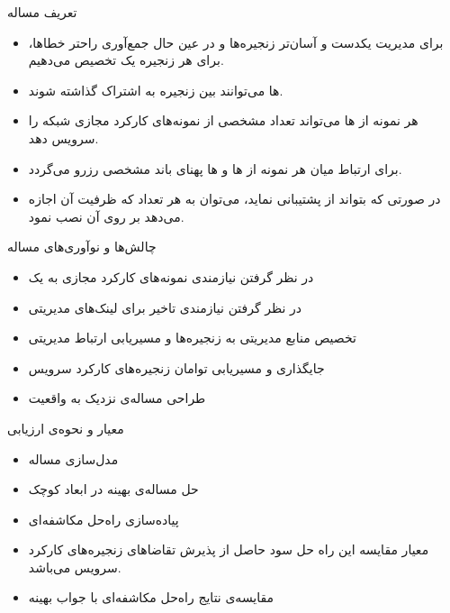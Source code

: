 \documentclass{beamer}
\makeatletter
\newcommand{\RTList}{\raggedleft\rightskip\@totalleftmargin}
\makeatother
\begin{document}
\begin{persian}
\begin{frame}{تعریف مساله}
    \justifying
    \begin{itemize}\RTList{}
        \item برای مدیریت یکدست و آسان‌تر زنجیره‌ها و در عین حال جمع‌آوری راحتر خطاها، برای هر زنجیره یک  تخصیص می‌دهیم.
        \item {}ها می‌توانند بین زنجیره به اشتراک گذاشته شوند.
        \item هر نمونه از ها می‌تواند تعداد مشخصی از نمونه‌های کارکرد مجازی شبکه را سرویس دهد. 
        \item برای ارتباط میان هر نمونه از ها و ها پهنای باند مشخصی رزرو می‌گردد.
        \item در صورتی که  بتواند از  پشتیبانی نماید،
        می‌توان به هر تعداد که ظرفیت آن اجازه می‌دهد بر روی آن  نصب نمود.
    \end{itemize}
\end{frame}
\begin{frame}{چالش‌ها و نوآوری‌های مساله}
    \begin{itemize}\RTList{}
        \item در نظر گرفتن نیازمندی نمونه‌های کارکرد مجازی به یک 
        \item در نظر گرفتن نیازمندی تاخیر برای لینک‌های مدیریتی
        \item تخصیص منابع مدیریتی به زنجیره‌ها و مسیریابی ارتباط مدیریتی
        \item جایگذاری و مسیریابی توامان زنجیره‌های کارکرد سرویس
        \item طراحی مساله‌ی نزدیک به واقعیت
    \end{itemize}
\end{frame}
\begin{frame}{معیار و نحوه‌ی ارزیابی}
    \begin{itemize}\RTList{}
        \item مدل‌سازی مساله
        \item حل مساله‌ی بهینه در ابعاد کوچک
        \item پیاده‌سازی راه‌حل مکاشفه‌ای
        \item معیار مقایسه این راه حل سود حاصل از پذیرش تقاضاهای زنجیره‌های کارکرد سرویس می‌باشد.
        \item مقایسه‌ی نتایج راه‌حل مکاشفه‌ای با جواب بهینه
    \end{itemize}
\end{frame}
\begin{frame}{}

\end{frame}
\end{persian}
\end{document}
